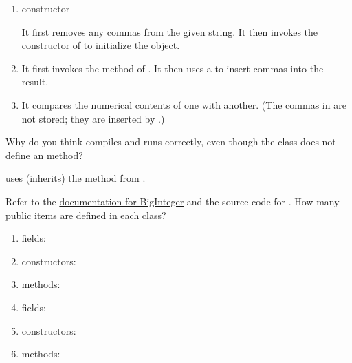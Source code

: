 \begin{enumerate}

\item {} constructor

\begin{answer}[3em]
It first removes any commas from the given string.
It then invokes the constructor of  to initialize the object.
\end{answer}

\item {}

\begin{answer}[3em]
It first invokes the  method of .
It then uses a  to insert commas into the result.
\end{answer}

\item {}

\begin{answer}[3em]
It compares the numerical contents of one  with another.
(The commas in  are not stored; they are inserted by .)
\end{answer}

\end{enumerate}


\Q \label{key1}
Why do you think  compiles and runs correctly, even though the  class does not define an  method?

\begin{answer}[3em]
 uses (inherits) the  method from .
\end{answer}


\Q \label{count1}
Refer to the \href{https://docs.oracle.com/en/java/javase/11/docs/api/java.base/java/math/BigInteger.html}{documentation for BigInteger} and the source code for .
How many public items are defined in each class?

\setlength{\defaultwidth}{2em}

\begin{multicols}{2}
\begin{enumerate}
\item {} fields: 
\item {} constructors: 
\item {} methods: 

\item {} fields: 
\item {} constructors: 
\item {} methods: 
\end{enumerate}
\end{multicols}


